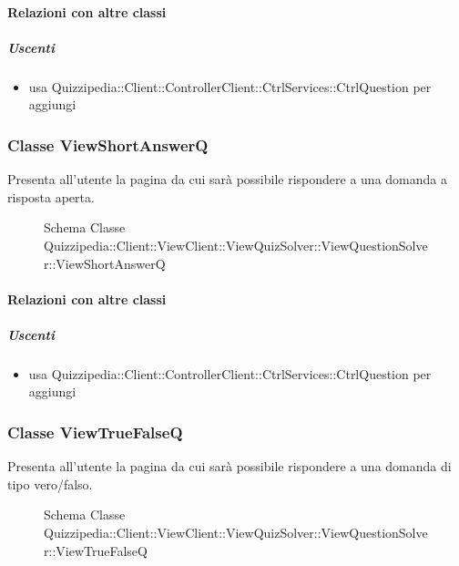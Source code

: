 \paragraph{Relazioni con altre classi}
\subparagraph{Uscenti}
\begin{itemize}
\item usa Quizzipedia::Client::ControllerClient::CtrlServices::CtrlQuestion per aggiungi
\end{itemize}
\subsubsection{Classe ViewShortAnswerQ}
Presenta all'utente la pagina da cui sarà possibile rispondere a una domanda a risposta aperta.
\begin{figure}[H]
\centering
\noindent{}
\caption[Schema Classe ViewShortAnswerQ]{Schema Classe Quizzipedia::Client::ViewClient::ViewQuizSolver::ViewQuestionSolver::ViewShortAnswerQ}
\end{figure}
\paragraph{Relazioni con altre classi}
\subparagraph{Uscenti}
\begin{itemize}
\item usa Quizzipedia::Client::ControllerClient::CtrlServices::CtrlQuestion per aggiungi
\end{itemize}
\subsubsection{Classe ViewTrueFalseQ}
Presenta all'utente la pagina da cui sarà possibile rispondere a una domanda di tipo vero/falso.
\begin{figure}[H]
\centering
\noindent{}
\caption[Schema Classe ViewTrueFalseQ]{Schema Classe Quizzipedia::Client::ViewClient::ViewQuizSolver::ViewQuestionSolver::ViewTrueFalseQ}
\end{figure}
